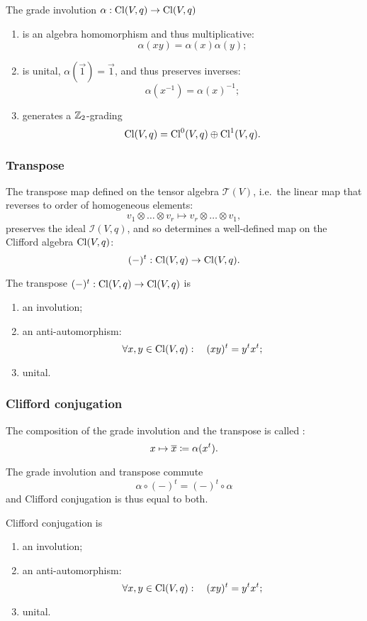 \begin{lemma}
The grade involution $\alpha: \operatorname{Cl}(V,q) \to \operatorname{Cl}(V,q)$
\begin{enumerate}
\item is an algebra homomorphism and thus multiplicative:
\[ \alpha(xy) = \alpha(x)\alpha(y); \]
\item is unital, $\alpha(\vec{1}) = \vec{1}$, and thus preserves inverses:
\[ \alpha(x^{-1}) = \alpha(x)^{-1}; \]
\item generates a $\mathbb{Z}_2$-grading 
\[ \operatorname{Cl}(V,q) = \operatorname{Cl}^0(V,q)\oplus \operatorname{Cl}^1(V,q). \]
\end{enumerate}
\end{lemma}

\subsubsection{Transpose}
The transpose map defined on the tensor algebra $\mathcal{T}(V)$, i.e.\ the linear map that reverses to order of homogeneous elements:
\[ v_1\otimes \ldots \otimes v_r \mapsto v_r \otimes \ldots \otimes v_1, \]
preserves the ideal $\mathcal{I}(V,q)$, and so determines a well-defined map on the Clifford algebra $\operatorname{Cl}(V,q)$:
\[ (-)^t: \operatorname{Cl}(V,q)\to \operatorname{Cl}(V,q). \]
\begin{lemma}
The transpose $(-)^t: \operatorname{Cl}(V,q)\to \operatorname{Cl}(V,q)$ is
\begin{enumerate}
\item an involution;
\item an anti-automorphism:
\[ \forall x,y\in \operatorname{Cl}(V,q): \quad (xy)^t = y^tx^t; \]
\item unital.
\end{enumerate}
\end{lemma}

\subsubsection{Clifford conjugation}
\begin{definition}
The composition of the grade involution and the transpose is called :
\[ x\mapsto \overline{x} \coloneqq \alpha(x^t). \]
\end{definition}
\begin{lemma}
The grade involution and transpose commute
\[ \alpha \circ(-)^t = (-)^t\circ \alpha \]
and Clifford conjugation is thus equal to both.
\end{lemma}

\begin{lemma}
Clifford conjugation is
\begin{enumerate}
\item an involution;
\item an anti-automorphism:
\[ \forall x,y\in \operatorname{Cl}(V,q): \quad (xy)^t = y^tx^t; \]
\item unital.
\end{enumerate}
\end{lemma}

